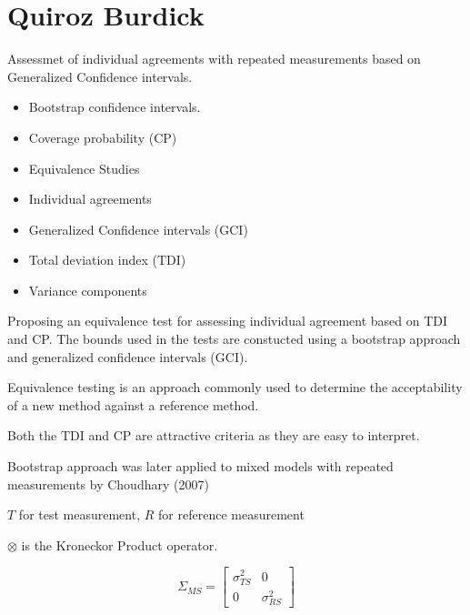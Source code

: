 \documentclass[12pt, a4paper]{article}
\begin{document}
	\chapter{Quiroz Burdick}
Assessmet of individual agreements with repeated measurements based on Generalized Confidence intervals.

\begin{itemize}
	\item Bootstrap confidence intervals.
	\item Coverage probability (CP)
	\item Equivalence Studies
	\item Individual agreements
	\item Generalized Confidence intervals (GCI)
	\item Total deviation index (TDI)
	\item Variance components
\end{itemize}


Proposing an equivalence test for assessing individual agreement based on TDI and CP.
The bounds used in the tests are constucted using a bootstrap approach and generalized confidence intervals (GCI).


Equivalence testing is an approach commonly used to determine the acceptability of a new method 
against a reference method.


Both the TDI and CP are attractive criteria as they are easy to interpret.

Bootstrap approach was later applied to mixed models with repeated measurements by Choudhary (2007)

$T$ for test measurement, $R$ for reference measurement


$\otimes$ is the Kroneckor Product operator.

\[  \Sigma_{MS} =  \left[     \begin{array}{cc} \sigma^2_{TS} & 0 \\ 0 & \sigma^2_{RS} \end{array}\right] \]
\end{document}
